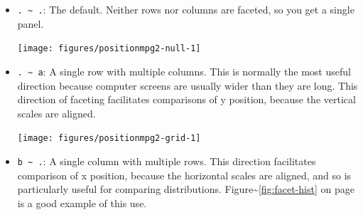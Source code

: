 \begin{itemize}
\item
  \texttt{. \textasciitilde{} .}: The default. Neither rows nor columns
  are faceted, so you get a single panel.

\begin{Shaded}
\begin{Highlighting}[]
\NormalTok{>}\StringTok{ } \StringTok{ }\NormalTok{()}
\end{Highlighting}
\end{Shaded}

  \texttt{[image: figures/positionmpg2-null-1]}
\item
  \texttt{. \textasciitilde{} a}: A single row with multiple columns.
  This is normally the most useful direction because computer screens
  are usually wider than they are long. This direction of faceting
  facilitates comparisons of y position, because the vertical scales are
  aligned.

\begin{Shaded}
\begin{Highlighting}[]
\NormalTok{>}\StringTok{ } \StringTok{ }\StringTok{ }
\end{Highlighting}
\end{Shaded}

  \texttt{[image: figures/positionmpg2-grid-1]}
\item
  \texttt{b \textasciitilde{} .}: A single column with multiple rows.
  This direction facilitates comparison of x position, because the
  horizontal scales are aligned, and so is particularly useful for
  comparing distributions. Figure\textasciitilde{}\ref{fig:facet-hist}
  on page \pageref{fig:facet-hist} is a good example of this use.
\end{itemize}

\begin{Shaded}
\begin{Highlighting}[]
\NormalTok{>}\StringTok{ } \NormalTok{, } \NormalTok{) +}
\NormalTok{+}\StringTok{   }\StringTok{ }
\end{Highlighting}
\end{Shaded}

